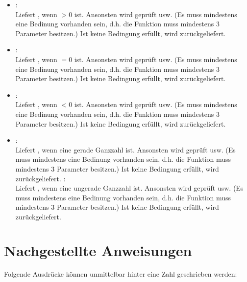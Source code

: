 \begin{itemize}
\item
{}:\\
Liefert , wenn $>0$ ist. Ansonsten wird  geprüft usw.
(Es muss mindestens eine Bedinung vorhanden sein, d.h. die Funktion muss mindestens 3 Parameter besitzen.)
Ist keine Bedingung erfüllt, wird  zurückgeliefert.
\item
{}:\\
Liefert , wenn $=0$ ist. Ansonsten wird  geprüft usw.
(Es muss mindestens eine Bedinung vorhanden sein, d.h. die Funktion muss mindestens 3 Parameter besitzen.)
Ist keine Bedingung erfüllt, wird  zurückgeliefert.
\item
{}:\\
Liefert , wenn $<0$ ist. Ansonsten wird  geprüft usw.
(Es muss mindestens eine Bedinung vorhanden sein, d.h. die Funktion muss mindestens 3 Parameter besitzen.)
Ist keine Bedingung erfüllt, wird  zurückgeliefert.
\item
{}:\\
Liefert , wenn  eine gerade Ganzzahl ist. Ansonsten wird  geprüft usw.
(Es muss mindestens eine Bedinung vorhanden sein, d.h. die Funktion muss mindestens 3 Parameter besitzen.)
Ist keine Bedingung erfüllt, wird  zurückgeliefert.
:\\
Liefert , wenn  eine ungerade Ganzzahl ist. Ansonsten wird  geprüft usw.
(Es muss mindestens eine Bedinung vorhanden sein, d.h. die Funktion muss mindestens 3 Parameter besitzen.)
Ist keine Bedingung erfüllt, wird  zurückgeliefert.
\end{itemize}



\chapter{Nachgestellte Anweisungen}

Folgende Ausdrücke können unmittelbar hinter eine Zahl geschrieben werden:

